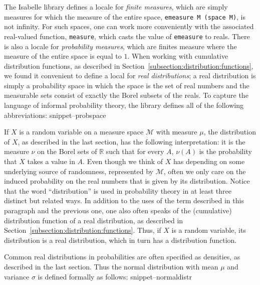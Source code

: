 \documentclass{svjour3}
\newcommand{\RR}{\mathbb{R}}
\newcommand{\mdl}[1]{{\mathcal #1}} %
\newcommand{\Snippet}[1]{\csname snippet--#1\endcsname}
\begin{document}
The Isabelle library defines a locale for \emph{finite measures}, which are simply measures for which the measure of the entire space, \texttt{emeasure M (space M)}, is not infinity. For such spaces, one can work more conveniently with the associated real-valued function, \texttt{measure}, which casts the value of \texttt{emeasure} to reals. There is also a locale for \emph{probability measures}, which are finites measure where the measure of the entire space is equal to $1$. When working with cumulative distribution functions, as described in Section~\ref{subsection:distribution:functions}, we found it convenient to define a local for \emph{real distributions}; a real distribution is simply a probability space in which the space is the set of real numbers and the measurable sets consist of exactly the Borel subsets of the reals. To capture the language of informal probability theory, the library defines all of the following abbreviations:
\Snippet{probspace}

If $X$ is a random variable on a measure space $\mdl M$ with measure $\mu$, the distribution of $X$, as described in the last section, has the following interpretation: it is the measure $\nu$ on the Borel sets of $\RR$ such that for every $A$, $\nu(A)$ is the probability that $X$ takes a value in $A$. Even though we think of $X$ has depending on some underlying source of randomness, represented by $\mdl M$, often we only care on the induced probability on the real numbers that is given by its distribution. Notice that the word ``distribution'' is used in probability theory in at least three distinct but related ways. In addition to the uses of the term described in this paragraph and the previous one, one also often speaks of the (cumulative) distribution function of a real distribution, as described in Section~\ref{subsection:distribution:functions}. Thus, if $X$ is a random variable, its distribution is a real distribution, which in turn has a distribution function.

Common real distributions in probabilities are often specified as densities, as described in the last section. Thus the normal distribution with mean $\mu$ and variance $\sigma$ is defined formally as follows:
\Snippet{normaldistr}
\end{document}
